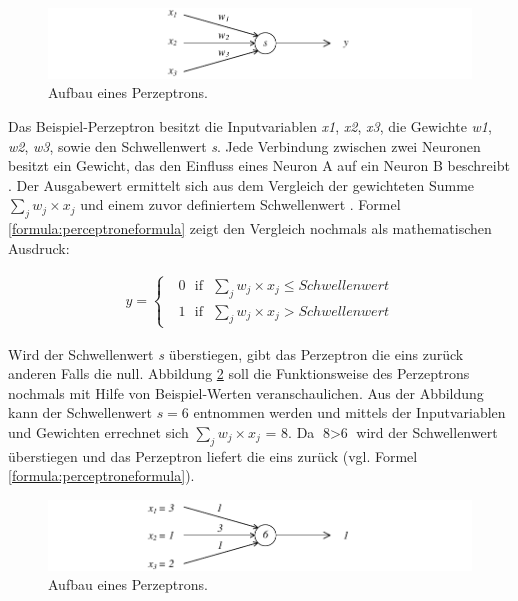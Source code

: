 \begin{figure}[ht]
\centering
\includegraphics{images/perceptron.pdf}
\caption{Aufbau eines Perzeptrons.}
\label{fig:perceptron}
\end{figure}

Das Beispiel-Perzeptron besitzt die Inputvariablen \textit{x1}, \textit{x2}, \textit{x3}, die Gewichte \textit{w1}, \textit{w2}, \textit{w3}, sowie den Schwellenwert \textit{s}. Jede Verbindung zwischen zwei Neuronen besitzt ein Gewicht, das den Einfluss eines Neuron A auf ein Neuron B beschreibt \cite [vgl. S. 86]{EA16}. Der Ausgabewert ermittelt sich aus dem Vergleich der gewichteten Summe $\sum_j w_{j}\times x_{j}$ und einem zuvor definiertem Schwellenwert \cite {HS99, LP87, WE16}. Formel \ref{formula:perceptroneformula} \cite {HS99, WE16} zeigt den Vergleich nochmals als mathematischen Ausdruck:

\begin{align}
\label{formula:perceptroneformula}
y = \begin{cases}\text{ }0\text{ }\text{if}\text{ }\sum_j w_{j}\times x_{j}\leq Schwellenwert\\\text{ }1\text{ }\text{if}\text{ }\sum_j w_{j}\times x_{j}> Schwellenwert\end{cases}
\end{align}

Wird der Schwellenwert \textit{s} überstiegen, gibt das Perzeptron die eins zurück anderen Falls die null. Abbildung \ref{fig:perceptronNumbered} soll die Funktionsweise des Perzeptrons nochmals mit Hilfe von Beispiel-Werten veranschaulichen. Aus der Abbildung kann der Schwellenwert $s=6$ entnommen werden und mittels der Inputvariablen und Gewichten errechnet sich $\sum_j w_{j}\times x_{j}\text{ = 8}$. Da $\text{8}>\text{6}$ wird der Schwellenwert überstiegen und das Perzeptron liefert die eins zurück (vgl. Formel \ref{formula:perceptroneformula}). 

\begin{figure}[ht]
\centering
\includegraphics{images/perceptronNumbered.pdf}
\caption{Aufbau eines Perzeptrons.}
\label{fig:perceptronNumbered}
\end{figure}


